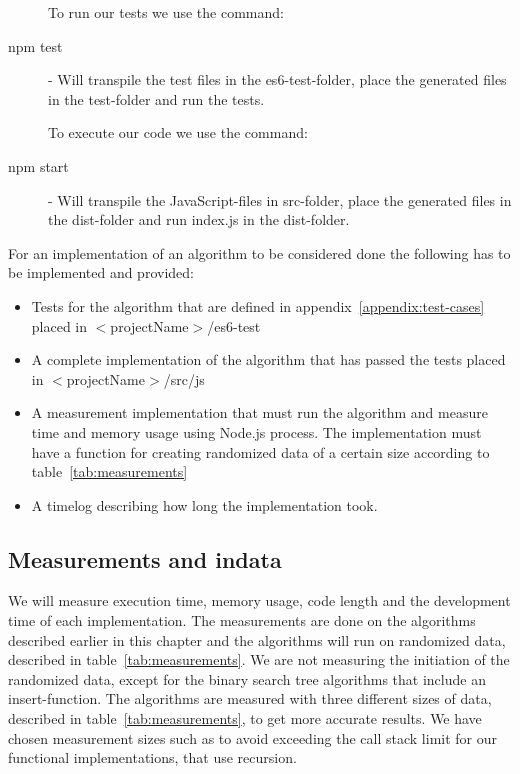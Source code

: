 \documentclass {article}
\begin{document}
\begin{description}
\item[] To run our tests we use the command:
\item[npm test] - Will transpile the test files in the es6-test-folder, place the generated files in the test-folder and run the tests.
\item[] To execute our code we use the command:
\item[npm start] - Will transpile the JavaScript-files in src-folder, place the generated files in the dist-folder and run index.js in the dist-folder.
\end{description}

For an implementation of an algorithm to be considered done the following has to be implemented and provided:
\begin{itemize}
\item Tests for the algorithm that are defined in appendix~\ref{appendix:test-cases} placed in \(<\)projectName\(>\)/es6-test
\item A complete implementation of the algorithm that has passed the tests placed in \(<\)projectName\(>\)/src/js
\item A measurement implementation that must run the algorithm and measure time and memory usage using Node.js process. The implementation must have a function for creating randomized data of a certain size according to table~\ref{tab:measurements} 
\item A timelog describing how long the implementation took. 
\end{itemize}
\subsection{Measurements and indata}
We will measure execution time, memory usage, code length and the development time of each implementation. The measurements are done on the algorithms described earlier in this chapter and the algorithms will run on randomized data, described in table~\ref{tab:measurements}. We are not measuring the initiation of the randomized data, except for the binary search tree algorithms that include an insert-function. The algorithms are measured with three different sizes of data, described in table~\ref{tab:measurements}, to get more accurate results. We have chosen measurement sizes such as to avoid exceeding the call stack limit for our functional implementations, that use recursion.
\end{document}
